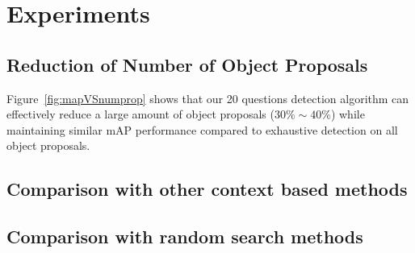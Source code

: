 \section{Experiments}

\subsection{Reduction of Number of Object Proposals}

Figure~\ref{fig:mapVSnumprop} shows that our 20 questions detection algorithm can effectively reduce a large amount of object proposals ($30\% \sim 40\%$) while maintaining similar mAP performance compared to exhaustive detection on all object proposals.  

\subsection{Comparison with other context based methods}

\subsection{Comparison with random search methods}


